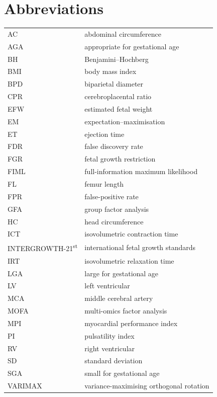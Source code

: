\documentclass[a4paper,fleqn]{cas-sc}
\begin{document}
\section*{Abbreviations} \begin{tabular}{@{}ll@{}} AC & abdominal circumference \\ AGA & appropriate for gestational age \\ BH & Benjamini--Hochberg \\ BMI & body mass index \\ BPD & biparietal diameter \\ CPR & cerebroplacental ratio \\ EFW & estimated fetal weight \\ EM & expectation--maximisation \\ ET & ejection time \\ FDR & false discovery rate \\ FGR & fetal growth restriction \\ FIML & full-information maximum likelihood \\ FL & femur length \\ FPR & false-positive rate \\ GFA & group factor analysis \\ HC & head circumference \\ ICT & isovolumetric contraction time \\ INTERGROWTH-21\textsuperscript{st} & international fetal growth standards \\ IRT & isovolumetric relaxation time \\ LGA & large for gestational age \\ LV & left ventricular \\ MCA & middle cerebral artery \\ MOFA & multi-omics factor analysis \\ MPI & myocardial performance index \\ PI & pulsatility index \\ RV & right ventricular \\ SD & standard deviation \\ SGA & small for gestational age \\ VARIMAX & variance-maximising orthogonal rotation \\ \end{tabular}
\end{document}

